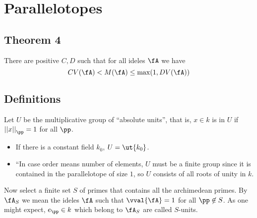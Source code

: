 \section{Parallelotopes}
\label{sec:orgheadline31}
\subsection{Theorem 4}
\label{sec:orgheadline29}
There are positive \(C, D\) such that for all ideles \(\fA\) we have
\[ CV(\fA) < M(\fA) \leq \max(1, DV(\fA)) \]

\subsection{Definitions}
\label{sec:orgheadline30}
Let \(U\) be the multiplicative group of ``absolute units'', that is, \(x\in k\) is in \(U\) if \({||x||}_\pp = 1\) for all \(\pp\).
\begin{itemize}
\item If there is a constant field \(k_0\), \(U=\ut {k_0}\).
\item ``In case order means number of elements, \(U\) must be a finite group since it is contained in the parallelotope of size \(1\), so \(U\) consists of all roots of unity in \(k\).
\end{itemize}
Now select a finite set \(S\) of primes that contains all the archimedean primes. By \(\fA_S\) we mean the ideles \(\fA\) such that \(\vval{ \fA } = 1\) for all \(\pp\not\in S\). As one might expect, \(e_\pp\in k\) which belong to \(\fA_S\) are called \(S\)-units.

